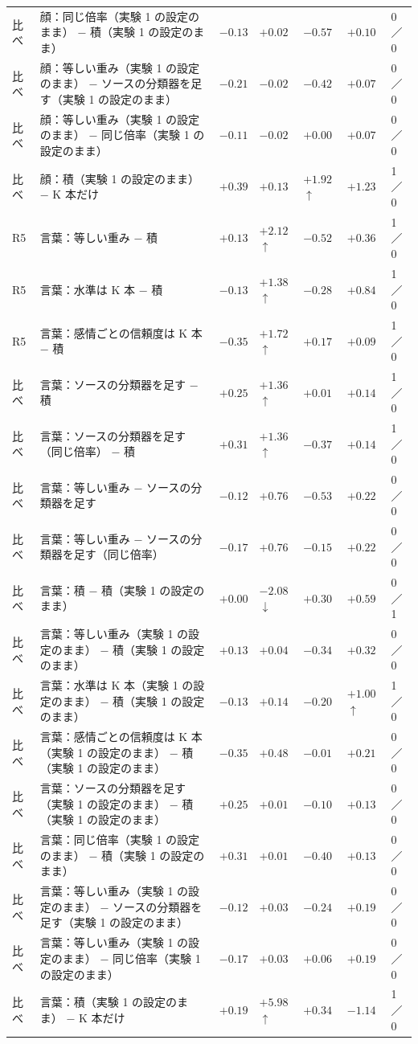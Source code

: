 \begin{longtable}{>{\raggedright}p{0.75cm}>{\raggedright}p{5.6cm}>{\raggedright}p{2.05cm}>{\raggedright}p{2.05cm}>{\raggedright}p{2.05cm}>{\raggedright}p{2.05cm}p{0.75cm}}
比べ & 顔：同じ倍率（実験 1 の設定のまま） − 積（実験 1 の設定のまま） & $-0.13$ & $+0.02$ & $-0.57$ & $+0.10$ & 0／0 \\
比べ & 顔：等しい重み（実験 1 の設定のまま） − ソースの分類器を足す（実験 1 の設定のまま） & $-0.21$ & $-0.02$ & $-0.42$ & $+0.07$ & 0／0 \\
比べ & 顔：等しい重み（実験 1 の設定のまま） − 同じ倍率（実験 1 の設定のまま） & $-0.11$ & $-0.02$ & $+0.00$ & $+0.07$ & 0／0 \\
比べ & 顔：積（実験 1 の設定のまま） − K 本だけ & $+0.39$ & $+0.13$ & $+1.92$$\uparrow$ & $+1.23$ & 1／0 \\
\midrule
R5 & 言葉：等しい重み − 積 & $+0.13$ & $+2.12$$\uparrow$ & $-0.52$ & $+0.36$ & 1／0 \\
R5 & 言葉：水準は K 本 − 積 & $-0.13$ & $+1.38$$\uparrow$ & $-0.28$ & $+0.84$ & 1／0 \\
R5 & 言葉：感情ごとの信頼度は K 本 − 積 & $-0.35$ & $+1.72$$\uparrow$ & $+0.17$ & $+0.09$ & 1／0 \\
比べ & 言葉：ソースの分類器を足す − 積 & $+0.25$ & $+1.36$$\uparrow$ & $+0.01$ & $+0.14$ & 1／0 \\
比べ & 言葉：ソースの分類器を足す（同じ倍率） − 積 & $+0.31$ & $+1.36$$\uparrow$ & $-0.37$ & $+0.14$ & 1／0 \\
比べ & 言葉：等しい重み − ソースの分類器を足す & $-0.12$ & $+0.76$ & $-0.53$ & $+0.22$ & 0／0 \\
比べ & 言葉：等しい重み − ソースの分類器を足す（同じ倍率） & $-0.17$ & $+0.76$ & $-0.15$ & $+0.22$ & 0／0 \\
比べ & 言葉：積 − 積（実験 1 の設定のまま） & $+0.00$ & $-2.08$$\downarrow$ & $+0.30$ & $+0.59$ & 0／1 \\
比べ & 言葉：等しい重み（実験 1 の設定のまま） − 積（実験 1 の設定のまま） & $+0.13$ & $+0.04$ & $-0.34$ & $+0.32$ & 0／0 \\
比べ & 言葉：水準は K 本（実験 1 の設定のまま） − 積（実験 1 の設定のまま） & $-0.13$ & $+0.14$ & $-0.20$ & $+1.00$$\uparrow$ & 1／0 \\
比べ & 言葉：感情ごとの信頼度は K 本（実験 1 の設定のまま） − 積（実験 1 の設定のまま） & $-0.35$ & $+0.48$ & $-0.01$ & $+0.21$ & 0／0 \\
比べ & 言葉：ソースの分類器を足す（実験 1 の設定のまま） − 積（実験 1 の設定のまま） & $+0.25$ & $+0.01$ & $-0.10$ & $+0.13$ & 0／0 \\
比べ & 言葉：同じ倍率（実験 1 の設定のまま） − 積（実験 1 の設定のまま） & $+0.31$ & $+0.01$ & $-0.40$ & $+0.13$ & 0／0 \\
比べ & 言葉：等しい重み（実験 1 の設定のまま） − ソースの分類器を足す（実験 1 の設定のまま） & $-0.12$ & $+0.03$ & $-0.24$ & $+0.19$ & 0／0 \\
比べ & 言葉：等しい重み（実験 1 の設定のまま） − 同じ倍率（実験 1 の設定のまま） & $-0.17$ & $+0.03$ & $+0.06$ & $+0.19$ & 0／0 \\
比べ & 言葉：積（実験 1 の設定のまま） − K 本だけ & $+0.19$ & $+5.98$$\uparrow$ & $+0.34$ & $-1.14$ & 1／0 \\
\midrule
\end{longtable}
